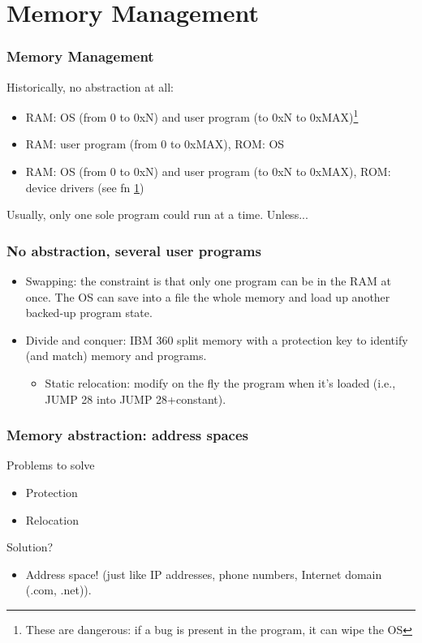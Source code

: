 \section{Memory Management}
  \begin{frame}
    \frametitle{Memory Management}
      Historically, no abstraction at all:
      \begin{itemize}
        \item RAM: OS (from 0 to 0xN) and user program (to 0xN to 0xMAX)\footnote{\label{fn:bug}These are dangerous: if a bug is present in the program, it can wipe the OS}
        \item RAM: user program (from 0 to 0xMAX), ROM: OS
        \item RAM: OS (from 0 to 0xN) and user program (to 0xN to 0xMAX), ROM: device drivers (see fn \ref{fn:bug})
      \end{itemize}
      Usually, only one sole program could run at a time. Unless...
  \end{frame}

  \begin{frame}
    \frametitle{No abstraction, several user programs}
    \begin{itemize}
      \item Swapping: the constraint is that only one program can be in the RAM at once. The OS can save into a file the whole memory and load up another backed-up program state.
      \item Divide and conquer: IBM 360 split memory with a protection key to identify (and match) memory and programs.
      \begin{itemize}
        \item Static relocation: modify on the fly the program when it's loaded (i.e., JUMP 28 into JUMP 28+constant).
      \end{itemize}
    \end{itemize}
  \end{frame}

  \begin{frame}
    \frametitle{Memory abstraction: address spaces}
    \begin{block}{Problems to solve}
      \begin{itemize}
        \item Protection
        \item Relocation
      \end{itemize}
    \end{block}
    \begin{block}{Solution?}
      \begin{itemize}
        \item Address space! (just like IP addresses, phone numbers, Internet domain (.com, .net)).
      \end{itemize}
    \end{block}
  \end{frame}

